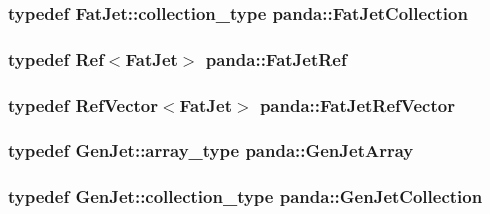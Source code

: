 \label{namespacepanda_a78151d325b1db9db73a5d43336ec3da8}
\hypertarget{namespacepanda_af6604b483c9123e1f5b9a805dc8da416}{
\subsubsection[{FatJetCollection}]{\setlength{\rightskip}{0pt plus 5cm}typedef {\bf FatJet::collection\_\-type} {\bf panda::FatJetCollection}}}
\label{namespacepanda_af6604b483c9123e1f5b9a805dc8da416}
\hypertarget{namespacepanda_a6cabf29d23a5c0dcf9e98615c69bc34a}{
\subsubsection[{FatJetRef}]{\setlength{\rightskip}{0pt plus 5cm}typedef {\bf Ref}$<${\bf FatJet}$>$ {\bf panda::FatJetRef}}}
\label{namespacepanda_a6cabf29d23a5c0dcf9e98615c69bc34a}
\hypertarget{namespacepanda_af3f9c44a78fa4a19b1ed37737dbefeae}{
\subsubsection[{FatJetRefVector}]{\setlength{\rightskip}{0pt plus 5cm}typedef {\bf RefVector}$<${\bf FatJet}$>$ {\bf panda::FatJetRefVector}}}
\label{namespacepanda_af3f9c44a78fa4a19b1ed37737dbefeae}
\hypertarget{namespacepanda_a3f721db724bab72328c7c0e7dbf52b14}{
\subsubsection[{GenJetArray}]{\setlength{\rightskip}{0pt plus 5cm}typedef {\bf GenJet::array\_\-type} {\bf panda::GenJetArray}}}
\label{namespacepanda_a3f721db724bab72328c7c0e7dbf52b14}
\hypertarget{namespacepanda_a35dec08f9805131c733e00465133b558}{
\subsubsection[{GenJetCollection}]{\setlength{\rightskip}{0pt plus 5cm}typedef {\bf GenJet::collection\_\-type} {\bf panda::GenJetCollection}}}
